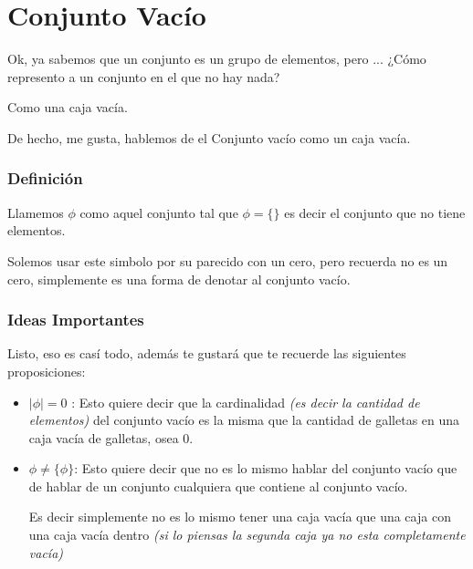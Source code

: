 \documentclass[12pt]{report}                                    %
\begin{document}
        \clearpage
        \section{Conjunto Vacío}
                
            Ok, ya sabemos que un conjunto es un grupo de elementos, pero ...
            ¿Cómo represento a un conjunto en el que no hay nada?

            Como una caja vacía.

            De hecho, me gusta, hablemos de el Conjunto vacío como un caja vacía.

            \subsubsection*{Definición}
            Llamemos $\phi$ como aquel conjunto tal que $\phi = \{ \}$ es decir el conjunto que no
            tiene elementos.

            Solemos usar este simbolo por su parecido con un cero, pero recuerda no es un cero, simplemente
            es una forma de denotar al conjunto vacío.

            \subsubsection*{Ideas Importantes}
            Listo, eso es casí todo, además te gustará que te recuerde las siguientes
            proposiciones:

            \begin{itemize}
                \item $|\phi| = 0$ : 
                        Esto quiere decir que la cardinalidad \emph{(es decir
                        la cantidad de elementos)} del conjunto vacío es la misma que 
                        la cantidad de galletas en una caja vacía de galletas, osea 0.

                \item $\phi \neq \{\phi\}$: 
                        Esto quiere decir que no es lo mismo hablar del conjunto
                        vacío que de hablar de un conjunto cualquiera que contiene al
                        conjunto vacío.

                        Es decir simplemente no es lo mismo tener una caja vacía que una caja
                        con una caja vacía dentro \emph{(si lo piensas la segunda caja ya 
                        no esta completamente vacía)}
            \end{itemize}
\end{document}
